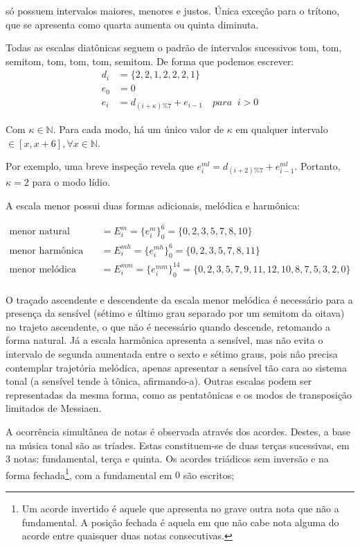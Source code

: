 só possuem intervalos maiores, menores e justos. Única exceção para o trítono, que se apresenta como quarta aumenta ou quinta diminuta.

Todas as escalas diatônicas
seguem o padrão de intervalos sucessivos
tom, tom, semitom, tom, tom, tom, semitom. De forma
que podemos escrever:
\begin{equation}
\begin{split}
d_i & =\{2,2,1,2,2,2,1\} \\
e_0 & =0 \\
e_i & =d_{(i+\kappa)\%7}+e_{i-1} \quad para \;\;  i > 0
\end{split}
\end{equation}

Com $\kappa \in \mathbb{N}$. Para cada
modo, há um único valor de $\kappa$ em qualquer intervalo $\in [x,x+6], \forall x \in \mathbb{N}$.

Por exemplo, uma breve
inspeção revela que $e_i^{ml}=d_{(i+2)\%7}+e_{i-1}^{ml}$. Portanto, $\kappa=2$
para o modo lídio. 

A escala menor possui duas formas adicionais, melódica e harmônica:

\begin{equation}
\begin{split}
\text{menor natural (igual acima)} & = E_i^m = \{e_i^m\}_0^6 = \{0,2,3,5,7,8,10\} \\
\text{menor harmônica} & = E_i^{mh} = \{e_i^{mh}\}_0^6 = \{0,2,3,5,7,8,11\} \\
\text{menor melódica} & = E_i^{mm} = \{e_i^{mm}\}_0^{14} = \{0,2,3,5,7,9,11,12,10,8,7,5,3,2,0\} \\
\end{split}
\end{equation}

O traçado ascendente e descendente da escala menor melódica é necessário para a presença da sensível (sétimo e último grau separado por um semitom da oitava) no trajeto ascendente, o que não é necessário quando descende, retomando a forma natural. Já a escala harmônica apresenta a sensível, mas não evita o intervalo de segunda aumentada entre o sexto e sétimo graus, pois não precisa contemplar trajetória melódica, apenas apresentar a sensível tão cara ao sistema tonal (a sensível tende à tônica, afirmando-a).\cite{Harmonia}
Outras escalas podem ser representadas da mesma forma, como as pentatônicas e os modos de transposição limitados de Messiaen.\cite{Messiaen}

A ocorrência simultânea de notas é observada através dos acordes. Destes, a base na música tonal são as tríades. Estas constituem-se de duas terças sucessivas, em 3 notas: fundamental, terça e quinta. Os acordes triádicos sem inversão e na forma fechada\footnote{Um acorde invertido é aquele que apresenta no grave outra nota que não a fundamental. A posição fechada é aquela em que não cabe nota alguma do acorde entre quaisquer duas notas consecutivas.\cite{Lacerda}},
com a fundamental em $0$ são escritos;

